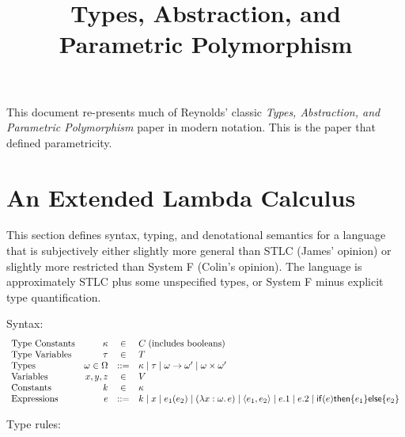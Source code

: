 \documentclass{article}
\title{Types, Abstraction, and Parametric Polymorphism}
\begin{document}
\maketitle
This document re-presents much of Reynolds' classic \emph{Types, Abstraction, and Parametric
Polymorphism} paper in modern notation.  This is the paper that defined parametricity.

\section*{An Extended Lambda Calculus}
This section defines syntax, typing, and denotational semantics for a language that is subjectively either
slightly more general than STLC (James' opinion) or slightly more restricted than System F (Colin's
opinion).  The language is approximately STLC plus some unspecified types, or System F minus
explicit type quantification.

Syntax:
\newcommand{\cond}[3]{\ensuremath{\mathsf{if}(#1)\mathsf{then}\{#2\}\mathsf{else}\{#3\}}}
\[
    \begin{array}{lrcl}
        \textrm{Type Constants} & \kappa & \in & C \;\textrm{(includes booleans)}\\
        \textrm{Type Variables} & \tau & \in & T\\
        \textrm{Types} & \omega\in\Omega & ::= & \kappa \mid \tau \mid \omega \rightarrow \omega'
        \mid \omega \times \omega'\\
        \textrm{Variables} & x,y,z & \in & V\\
        \textrm{Constants} & k & \in & \kappa\\
        \textrm{Expressions} & e & ::= & k \mid x \mid e_1(e_2) \mid (\lambda x:\omega\ldotp e) \mid
        \langle e_1 , e_2 \rangle \mid e.1 \mid e.2 \mid \cond{e}{e_1}{e_2}
    \end{array}
\]

Type rules:
\end{document}
